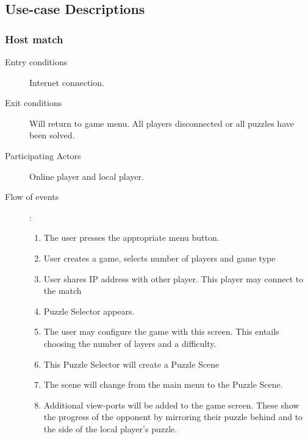 \documentclass[12pt]{article}
\begin{document}
\subsection{Use-case Descriptions}
\begin{mdframed}
    \subsubsection{Host match}
    \begin{description}
        \item[Entry conditions] Internet connection.
        \item[Exit conditions] Will return to game menu. All players
            disconnected or all puzzles have been solved.
        \item[Participating Actors] Online player and local player.
        \item[Flow of events]:
            \begin{enumerate}
                \item The user presses the appropriate menu button.
                \item User creates a game, selects number of players and game
                    type

                \item User shares IP address with other
                    player. This player may connect to the match
                \item Puzzle Selector appears.
                \item The user may configure the game with this screen.
                    This
                    entails choosing the number of layers and a difficulty.
                \item This Puzzle Selector will create a Puzzle Scene
                \item The scene will change from the main menu to the Puzzle
                    Scene.
                \item Additional view-ports will be added to the game screen.
                These show the progress of the opponent by mirroring their
                puzzle behind and to the side of the local player's puzzle.

            \end{enumerate}
    \end{description}
\end{mdframed}
\end{document}
